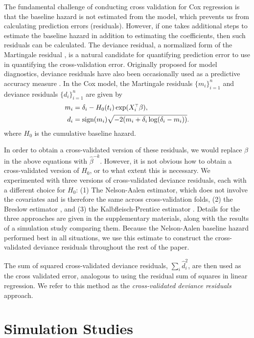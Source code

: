 The fundamental challenge of conducting cross validation for Cox regression is that the baseline hazard is not estimated from the model, which prevents us from calculating prediction errors (residuals).  However, if one takes additional steps to estimate the baseline hazard in addition to estimating the coefficients, then such residuals can be calculated.  The deviance residual, a normalized form of the Martingale residual \citep{Therneau1990}, is a natural candidate for quantifying prediction error to use in quantifying the cross-validation error.   Originally proposed for model diagnostics, deviance residuals have also been occasionally used as a predictive accuracy measure \citep{Therneau2018}.  In the Cox model, the Martingale residuals $\{m_i\}_{i=1}^n$ and deviance residuals $\{d_i\}_{i=1}^n$ are given by
\begin{align}
  \label{eq:res-m}
  m_{i} &= \delta_{i} - H_{0}(t_{i})\exp(X_i^{\scriptscriptstyle\top}\beta), \\
  \label{eq:res-d}
  d_{i} &= \text{sign}(m_{i})\sqrt{-2(m_i + \delta_{i}\log(\delta_{i} - m_i))}.  
\end{align}
where $H_0$ is the cumulative baseline hazard.

In order to obtain a cross-validated version of these residuals, we would replace $\beta$ in the above equations with $\hat{\beta}^{-k}$.  However, it is not obvious how to obtain a cross-validated version of $H_0$, or to what extent this is necessary.  We experimented with three versions of cross-validated deviance residuals, each with a different choice for $H_0$: (1) The Nelson-Aalen estimator, which does not involve the covariates and is therefore the same across cross-validation folds, (2) the Breslow estimator \citep{Breslow1972}, and (3) the Kalbfleisch-Prentice estimator \citep{Kalbfleisch2011}.  Details for the three approaches are given in the supplementary materials, along with the results of a simulation study comparing them.  Because the Nelson-Aalen baseline hazard performed best in all situations, we use this estimate to construct the cross-validated deviance residuals throughout the rest of the paper.

The sum of squared cross-validated deviance residuals, $\sum_{i}\hat{d}_{i}^2$, are then used as the cross validated error, analogous to using the residual sum of squares in linear regression. We refer to this method as the \emph{cross-validated deviance residuals} approach.

\section{Simulation Studies}

